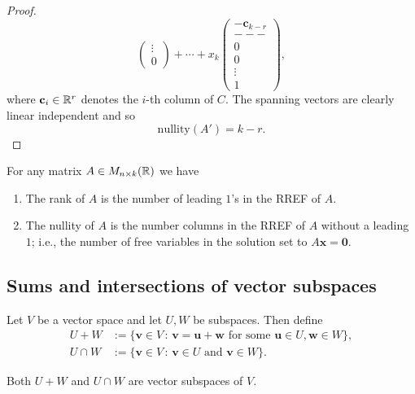 \documentclass[10pt, a4paper]{article}
\newcommand{\mbf}[1]{\mathbf{#1}}
\begin{document}
\begin{theorem}
\begin{proof}
\[\begin{pmatrix}
            \vdots \\
            0
        \end{pmatrix}
        +
        \dotsi
        +
        x_k\begin{pmatrix}
            -\mbf{c}_{k - r} \\
            - - - \\
            0 \\
            0 \\
            \vdots \\
            1
        \end{pmatrix},
        \]
        where $\mbf{c}_i \in \R ^ r$ denotes the $i$-th column of $C$.
        The spanning vectors are clearly linear independent and so
        \[
        \mathrm{nullity}(A') = k - r.
        \]
    \end{proof}
\end{theorem}

\begin{corollary}
    For any matrix $A \in M_{n \times k}(\mathbb{R})$ we have
    \begin{enumerate}[label = (\roman*)]
        \item The rank of $A$ is the number of leading $1$'s in the RREF of $A$.
        \item The nullity of $A$ is the number columns in the RREF of $A$ without a leading $1$;
        i.e.,
        the number of free variables in the solution set to $A\mbf{x} = \mbf{0}$.
    \end{enumerate}
\end{corollary}

\subsection{Sums and intersections of vector subspaces}
Let $V$ be a vector space and let $U, W$ be subspaces.
Then define
\begin{align*}
    U + W &:= \{\mbf{v} \in V\,:\, \mbf{v} = \mbf{u + w}\text{ for some }\mbf{u} \in U, \mbf{w} \in W\}, \\
    U \cap W &:= \{\mbf{v} \in V\,:\, \mbf{v} \in U\text{ and } \mbf{v} \in W\}.
\end{align*}

Both $U + W$ and $U \cap W$ are vector subspaces of $V$.
\end{document}

